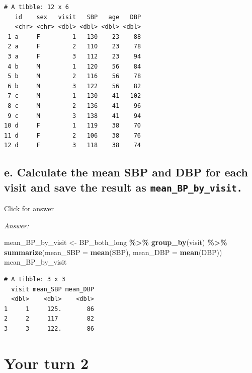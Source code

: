 \documentclass[
]{book}
\newenvironment{Shaded}{\begin{snugshade}}{\end{snugshade}}
\newcommand{\AttributeTok}[1]{\textcolor[rgb]{0.13,0.29,0.53}{#1}}
\newcommand{\FunctionTok}[1]{\textcolor[rgb]{0.13,0.29,0.53}{\textbf{#1}}}
\newcommand{\NormalTok}[1]{#1}
\newcommand{\OtherTok}[1]{\textcolor[rgb]{0.56,0.35,0.01}{#1}}
\newcommand{\SpecialCharTok}[1]{\textcolor[rgb]{0.81,0.36,0.00}{\textbf{#1}}}
\begin{document}
\begin{verbatim}
# A tibble: 12 x 6
   id    sex   visit   SBP   age   DBP
   <chr> <chr> <dbl> <dbl> <dbl> <dbl>
 1 a     F         1   130    23    88
 2 a     F         2   110    23    78
 3 a     F         3   112    23    94
 4 b     M         1   120    56    84
 5 b     M         2   116    56    78
 6 b     M         3   122    56    82
 7 c     M         1   130    41   102
 8 c     M         2   136    41    96
 9 c     M         3   138    41    94
10 d     F         1   119    38    70
11 d     F         2   106    38    76
12 d     F         3   118    38    74
\end{verbatim}

\hypertarget{e.-calculate-the-mean-sbp-and-dbp-for-each-visit-and-save-the-result-as-mean_bp_by_visit.}{%
\subsection{\texorpdfstring{e. Calculate the mean SBP and DBP for each visit and save the result as \texttt{mean\_BP\_by\_visit.}}{e. Calculate the mean SBP and DBP for each visit and save the result as mean\_BP\_by\_visit.}}\label{e.-calculate-the-mean-sbp-and-dbp-for-each-visit-and-save-the-result-as-mean_bp_by_visit.}}

Click for answer

\emph{Answer:}

\begin{Shaded}
\begin{Highlighting}[]
\NormalTok{mean\_BP\_by\_visit }\OtherTok{\textless{}{-}}\NormalTok{ BP\_both\_long }\SpecialCharTok{\%\textgreater{}\%}
  \FunctionTok{group\_by}\NormalTok{(visit) }\SpecialCharTok{\%\textgreater{}\%}
  \FunctionTok{summarize}\NormalTok{(}\AttributeTok{mean\_SBP =} \FunctionTok{mean}\NormalTok{(SBP),}
            \AttributeTok{mean\_DBP =} \FunctionTok{mean}\NormalTok{(DBP))}
\NormalTok{mean\_BP\_by\_visit}
\end{Highlighting}
\end{Shaded}

\begin{verbatim}
# A tibble: 3 x 3
  visit mean_SBP mean_DBP
  <dbl>    <dbl>    <dbl>
1     1     125.       86
2     2     117        82
3     3     122.       86
\end{verbatim}

\hypertarget{your-turn-2}{%
\section{Your turn 2}\label{your-turn-2}}
\end{document}
